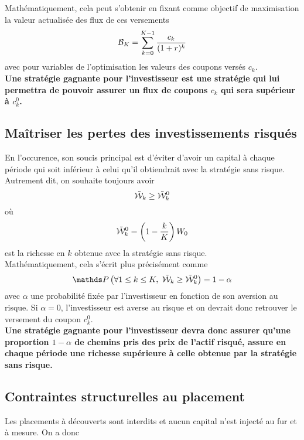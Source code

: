 \documentclass{article}
\numberwithin{equation}{section}
\begin{document}
Mathématiquement, cela peut s'obtenir en fixant comme objectif de maximisation la valeur actualisée des flux de ces versements
\begin{equation}
\mathcal{B}_K = \sum_{k=0}^{K - 1} \frac{c_k}{(1 + r)^k}
\end{equation}
avec pour variables de l'optimisation les valeurs des coupons versés $c_k$.\\

\textbf{\color{awesomePurple}Une stratégie gagnante pour l'investisseur est une stratégie qui lui permettra de pouvoir assurer un flux de coupons $c_k$ qui sera supérieur à $c^0_k$.}

\subsection{Maîtriser les pertes des investissements risqués}

En l'occurence, son soucis principal est d'éviter d'avoir un capital à chaque période qui soit inférieur à celui qu'il obtiendrait avec la stratégie sans risque. Autrement dit, on souhaite toujours avoir
$$
\tilde {\mathcal{W}}_k\geq\tilde{\mathcal{W}}^0_k
$$
où 
$$
\tilde{\mathcal{W}}^0_k = \left( 1 - \frac{k}{K} \right)W_0
$$
est la richesse en $k$ obtenue avec la stratégie sans risque.
\\

Mathématiquement, cela s'écrit plus précisément comme
\begin{equation}
\mathds P\left(\forall 1\leq k\leq K,\ \tilde \W_k\geq\tilde\W^0_k\right) = 1 - \alpha
\end{equation}
avec $\alpha$ une probabilité fixée par l'investisseur en fonction de son aversion au risque. Si $\alpha = 0$, l'investisseur est averse au risque et on devrait donc retrouver le versement du coupon $c_k^0$.\\

\textbf{\color{awesomePurple}Une stratégie gagnante pour l'investisseur devra donc assurer qu'une proportion $1 - \alpha$ de chemins pris des prix de l'actif risqué, assure en chaque période une richesse supérieure à celle obtenue par la stratégie sans risque.}

\subsection{Contraintes structurelles au placement}

Les placements à découverts sont interdits et aucun capital n'est injecté au fur et à mesure. On a donc
\end{document}

